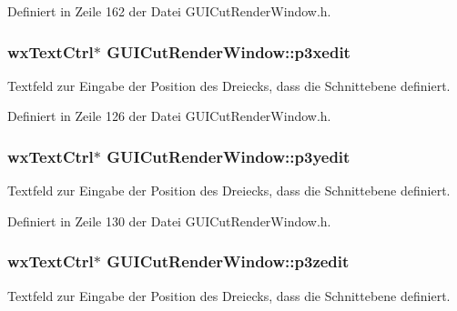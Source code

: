 Definiert in Zeile 162 der Datei G\-U\-I\-Cut\-Render\-Window.\-h.

\hypertarget{classGUICutRenderWindow_a3382e7bd629988774c4f5e81bf66ca7e}{
\subsubsection[{p3xedit}]{\setlength{\rightskip}{0pt plus 5cm}wx\-Text\-Ctrl$\ast$ G\-U\-I\-Cut\-Render\-Window\-::p3xedit\hspace{0.3cm}{\ttfamily [private]}}}\label{classGUICutRenderWindow_a3382e7bd629988774c4f5e81bf66ca7e}
Textfeld zur Eingabe der Position des Dreiecks, dass die Schnittebene definiert. 

Definiert in Zeile 126 der Datei G\-U\-I\-Cut\-Render\-Window.\-h.

\hypertarget{classGUICutRenderWindow_a5f908b41a4d9db847cd89c0a3c52b61a}{
\subsubsection[{p3yedit}]{\setlength{\rightskip}{0pt plus 5cm}wx\-Text\-Ctrl$\ast$ G\-U\-I\-Cut\-Render\-Window\-::p3yedit\hspace{0.3cm}{\ttfamily [private]}}}\label{classGUICutRenderWindow_a5f908b41a4d9db847cd89c0a3c52b61a}
Textfeld zur Eingabe der Position des Dreiecks, dass die Schnittebene definiert. 

Definiert in Zeile 130 der Datei G\-U\-I\-Cut\-Render\-Window.\-h.

\hypertarget{classGUICutRenderWindow_ac4c2f8825a9596f32093f0ac08a7848d}{
\subsubsection[{p3zedit}]{\setlength{\rightskip}{0pt plus 5cm}wx\-Text\-Ctrl$\ast$ G\-U\-I\-Cut\-Render\-Window\-::p3zedit\hspace{0.3cm}{\ttfamily [private]}}}\label{classGUICutRenderWindow_ac4c2f8825a9596f32093f0ac08a7848d}
Textfeld zur Eingabe der Position des Dreiecks, dass die Schnittebene definiert. 

